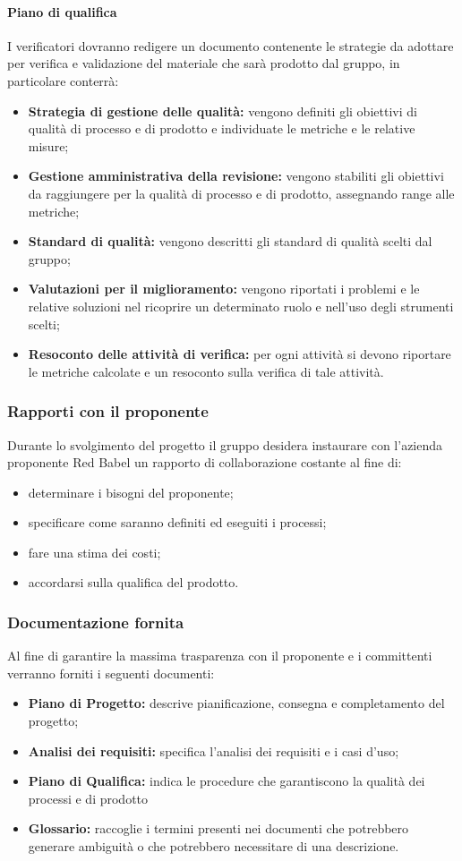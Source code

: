 \paragraph{Piano di qualifica}
I verificatori dovranno redigere un documento contenente le strategie da adottare per verifica e validazione del materiale che sarà prodotto dal gruppo, in particolare conterrà:
\begin{itemize}
	\item \textbf{Strategia di gestione delle qualità:} vengono definiti gli obiettivi di qualità di processo e di prodotto e individuate le metriche e le relative misure;
	\item \textbf{Gestione amministrativa della revisione:} vengono stabiliti gli obiettivi da raggiungere per la qualità di processo e di prodotto, assegnando range alle metriche;
	\item \textbf{Standard di qualità:} vengono descritti gli standard di qualità scelti dal gruppo;
	\item \textbf{Valutazioni per il miglioramento:} vengono riportati i problemi e le relative soluzioni nel ricoprire un determinato ruolo e nell'uso degli strumenti scelti;
	\item \textbf{Resoconto delle attività di verifica:} per ogni attività si devono riportare le metriche calcolate e un resoconto sulla verifica di tale attività.
\end{itemize}
\subsubsection{Rapporti con il proponente}
Durante lo svolgimento del progetto il gruppo desidera instaurare con l'azienda proponente Red Babel un rapporto di collaborazione costante al fine di:
\begin{itemize}
	\item determinare i bisogni del proponente;
	\item specificare come saranno definiti ed eseguiti i processi;
	\item fare una stima dei costi;
	\item accordarsi sulla qualifica del prodotto.
\end{itemize}
\subsubsection{Documentazione fornita}
Al fine di garantire la massima trasparenza con il proponente e i committenti verranno forniti i seguenti documenti:
\begin{itemize}
	\item \textbf{Piano di Progetto:} descrive pianificazione, consegna e completamento del progetto;
	\item \textbf{Analisi dei requisiti:} specifica l'analisi dei requisiti e i casi d'uso;
	\item \textbf{Piano di Qualifica:} indica le procedure che garantiscono la qualità dei processi e di prodotto
	\item \textbf{Glossario:} raccoglie i termini presenti nei documenti che potrebbero generare ambiguità o che potrebbero necessitare di una descrizione.
\end{itemize}
